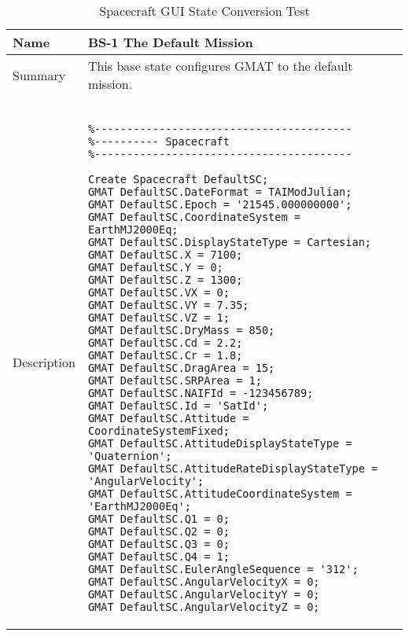 \begin{table}[htbp!]
\centering
      \begin{tabular}{|p{1.05 in} |p{4.75 in} |}
      \hline
         \rowcolor[rgb]{0.8,0.8,0.8} Name & BS-1 The Default Mission\\
         \hline
         Summary &
         This base state configures GMAT to the default mission. 
         \\ \hline
         Description & 
        \begin{verbatim}

%----------------------------------------
%---------- Spacecraft
%----------------------------------------

Create Spacecraft DefaultSC;
GMAT DefaultSC.DateFormat = TAIModJulian;
GMAT DefaultSC.Epoch = '21545.000000000';
GMAT DefaultSC.CoordinateSystem = EarthMJ2000Eq;
GMAT DefaultSC.DisplayStateType = Cartesian;
GMAT DefaultSC.X = 7100;
GMAT DefaultSC.Y = 0;
GMAT DefaultSC.Z = 1300;
GMAT DefaultSC.VX = 0;
GMAT DefaultSC.VY = 7.35;
GMAT DefaultSC.VZ = 1;
GMAT DefaultSC.DryMass = 850;
GMAT DefaultSC.Cd = 2.2;
GMAT DefaultSC.Cr = 1.8;
GMAT DefaultSC.DragArea = 15;
GMAT DefaultSC.SRPArea = 1;
GMAT DefaultSC.NAIFId = -123456789;
GMAT DefaultSC.Id = 'SatId';
GMAT DefaultSC.Attitude = CoordinateSystemFixed;
GMAT DefaultSC.AttitudeDisplayStateType = 'Quaternion';
GMAT DefaultSC.AttitudeRateDisplayStateType = 'AngularVelocity';
GMAT DefaultSC.AttitudeCoordinateSystem = 'EarthMJ2000Eq';
GMAT DefaultSC.Q1 = 0;
GMAT DefaultSC.Q2 = 0;
GMAT DefaultSC.Q3 = 0;
GMAT DefaultSC.Q4 = 1;
GMAT DefaultSC.EulerAngleSequence = '312';
GMAT DefaultSC.AngularVelocityX = 0;
GMAT DefaultSC.AngularVelocityY = 0;
GMAT DefaultSC.AngularVelocityZ = 0;
         \end{verbatim}
         \\ \hline
\end{tabular}
      \label{Table: BS-1}
      \caption{Spacecraft GUI State Conversion Test}
\end{table} 

